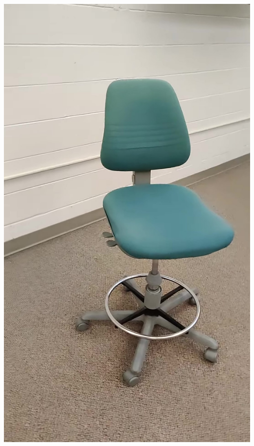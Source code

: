 \documentclass{article}
\begin{document}
\begin{center}
    \includegraphics[scale=0.04]{images/chair2.jpg}

\end{center}
\end{document}

